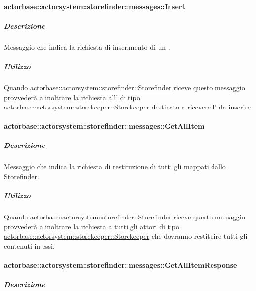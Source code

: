 \documentclass{scalatekids-article}
\begin{document}
\paragraph{actorbase::actorsystem::storefinder::messages::Insert}
\label{sec:actorbase::actorsystem::storefinder::messages::Insert}

\subparagraph{Descrizione}

Messaggio che indica la richiesta di inserimento di un .

\subparagraph{Utilizzo}

Quando \hyperref[sec:actorbase::actorsystem::storefinder::Storefinder]{actorbase::\allowbreak{}actorsystem::\allowbreak{}storefinder::\allowbreak{}Storefinder}
riceve questo messaggio provvederà a inoltrare la richiesta all' di tipo
\hyperref[sec:actorbase::actorsystem::storekeeper::Storekeeper]{actorbase::\allowbreak{}actorsystem::\allowbreak{}storekeeper::\allowbreak{}Storekeeper}
destinato a ricevere l' da inserire.

\paragraph{actorbase::actorsystem::storefinder::messages::GetAllItem}
\label{sec:actorbase::actorsystem::storefinder::messages::GetAllItem}

\subparagraph{Descrizione}

Messaggio che indica la richiesta di restituzione di tutti gli
 mappati dallo Storefinder.

\subparagraph{Utilizzo}

Quando \hyperref[sec:actorbase::actorsystem::storefinder::Storefinder]{actorbase::\allowbreak{}actorsystem::\allowbreak{}storefinder::\allowbreak{}Storefinder}
riceve questo messaggio provvederà a inoltrare la richiesta a tutti gli attori
di tipo
\hyperref[sec:actorbase::actorsystem::storekeeper::Storekeeper]{actorbase::\allowbreak{}actorsystem::\allowbreak{}storekeeper::\allowbreak{}Storekeeper}
che dovranno restituire tutti gli  contenuti in essi.

\paragraph{actorbase::actorsystem::storefinder::messages::GetAllItemResponse}
\label{sec:actorbase::actorsystem::storefinder::messages::GetAllItemResponse}

\subparagraph{Descrizione}
\end{document}
